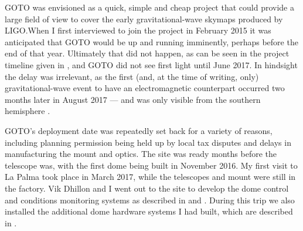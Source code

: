 \begin{colsection}

GOTO was envisioned as a quick, simple and cheap project that could provide a large field of view to cover the early gravitational-wave skymaps produced by LIGO.\@ When I first interviewed to join the project in February 2015 it was anticipated that GOTO would be up and running imminently, perhaps before the end of that year. Ultimately that did not happen, as can be seen in the project timeline given in , and GOTO did not see first light until June 2017. In hindsight the delay was irrelevant, as the first (and, at the time of writing, only) gravitational-wave event to have an electromagnetic counterpart occurred two months later in August 2017 --- and was only visible from the southern hemisphere \citep{GW170817,GW170817_followup}.

GOTO's deployment date was repeatedly set back for a variety of reasons, including planning permission being held up by local tax disputes and delays in manufacturing the mount and optics. The site was ready months before the telescope was, with the first dome being built in November 2016. My first visit to La Palma took place in March 2017, while the telescopes and mount were still in the factory. Vik Dhillon and I went out to the site to develop the dome control and conditions monitoring systems as described in  and . During this trip we also installed the additional dome hardware systems I had built, which are described in .


\end{colsection}
